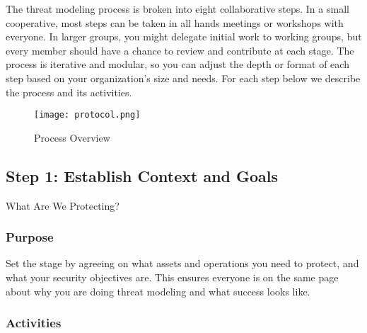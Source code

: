 The threat modeling process is broken into eight collaborative steps. In a small
cooperative, most steps can be taken in all hands meetings or workshops with
everyone. In larger groups, you might delegate initial work to
working groups, but every member should have a chance to review and contribute
at each stage. The process is iterative and modular, so you can adjust the depth
or format of each step based on your organization's size and needs. For each
step below we describe the process and its activities.

\begin{figure}[htbp]
    \centering
    \texttt{[image: protocol.png]}
    \caption{Process Overview}
    \label{fig:process_overview}
\end{figure}

\subsection{Step 1: Establish Context and Goals}
\label{subsec:Step1}

What Are We Protecting?

\subsubsection{Purpose}

Set the stage by agreeing on what assets and operations you need to protect, and
what your security objectives are. This ensures everyone is on the same page
about why you are doing threat modeling and what success looks like. 

\subsubsection{Activities}


